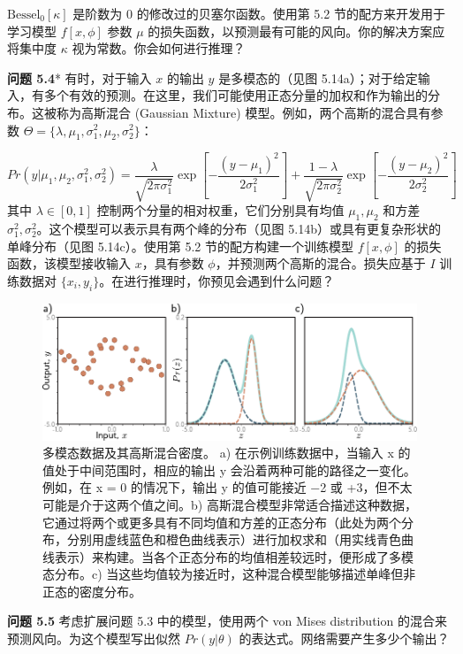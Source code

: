 \documentclass[lang=cn,newtx,10pt,scheme=chinese]{elegantbook}
\begin{document}
\(\text{Bessel}_0[\kappa]\) 是阶数为 0 的修改过的贝塞尔函数。使用第 5.2 节的配方来开发用于学习模型 \(f[x, \phi]\) 参数 \(\mu\) 的损失函数，以预测最有可能的风向。你的解决方案应将集中度 \(\kappa\) 视为常数。你会如何进行推理？ 

\textbf{问题 5.4}* 有时，对于输入 \(x\) 的输出 \(y\) 是多模态的（见图 5.14a）；对于给定输入，有多个有效的预测。在这里，我们可能使用正态分量的加权和作为输出的分布。这被称为高斯混合 (Gaussian Mixture) 模型。例如，两个高斯的混合具有参数 \(\Theta = \{\lambda, \mu_1, \sigma_1^2, \mu_2, \sigma_2^2\}\)：

\begin{equation}
Pr(y|\mu_1, \mu_2, \sigma_1^2, \sigma_2^2) = \frac{\lambda}{\sqrt{2\pi\sigma_1^2}} \exp \left[ -\frac{(y - \mu_1)^2}{2\sigma_1^2} \right] + \frac{1 - \lambda}{\sqrt{2\pi\sigma_2^2}} \exp \left[ -\frac{(y - \mu_2)^2}{2\sigma_2^2} \right] 
\end{equation}
其中 \(\lambda \in [0, 1]\) 控制两个分量的相对权重，它们分别具有均值 \(\mu_1, \mu_2\) 和方差 \(\sigma_1^2, \sigma_2^2\)。这个模型可以表示具有两个峰的分布（见图 5.14b）或具有更复杂形状的单峰分布（见图 5.14c）。使用第 5.2 节的配方构建一个训练模型 \(f[x, \phi]\) 的损失函数，该模型接收输入 \(x\)，具有参数 \(\phi\)，并预测两个高斯的混合。损失应基于 \(I\) 训练数据对 \(\{x_i, y_i\}\)。在进行推理时，你预见会遇到什么问题？

\begin{figure}[ht!]
	\centering
	\includegraphics[width=0.7\linewidth]{PDFFigures/UDLChap5PDF/LossMoG.pdf}
	\caption{多模态数据及其高斯混合密度。 a) 在示例训练数据中，当输入 x 的值处于中间范围时，相应的输出 y 会沿着两种可能的路径之一变化。例如，在 x = 0 的情况下，输出 y 的值可能接近 −2 或 +3，但不太可能是介于这两个值之间。b) 高斯混合模型非常适合描述这种数据，它通过将两个或更多具有不同均值和方差的正态分布（此处为两个分布，分别用虚线蓝色和橙色曲线表示）进行加权求和（用实线青色曲线表示）来构建。当各个正态分布的均值相差较远时，便形成了多模态分布。c) 当这些均值较为接近时，这种混合模型能够描述单峰但非正态的密度分布。}
\end{figure}


\textbf{问题 5.5} 考虑扩展问题 5.3 中的模型，使用两个 von Mises distribution 的混合来预测风向。为这个模型写出似然 \(Pr(y|\theta)\) 的表达式。网络需要产生多少个输出？
\end{document}
